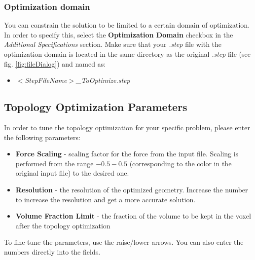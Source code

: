 \documentclass[
12pt, %
a4paper, %
oneside, %
headinclude,footinclude, %
BCOR5mm, %
]{scrartcl}
\begin{document}
\subsubsection{Optimization domain}
You can constrain the solution to be limited to a certain domain of optimization. In order to specify this, select the \textbf{Optimization Domain} checkbox in the \textit{Additional Specifications} section. Make sure that your \textit{.step} file with the optimization domain is located in the same directory as the original \textit{.step} file (see fig. \ref{fig:fileDialog}) and named as:
\begin{itemize}
\item[] \textit{$<$StepFileName$>${\_}ToOptimize.step}
\end{itemize}


\subsection{Topology Optimization Parameters}
In order to tune the topology optimization for your specific problem, please enter the following parameters:
\begin{itemize}
\item \textbf{Force Scaling} - scaling factor for the force from the input file. Scaling is performed from the range $-0.5 - 0.5$ (corresponding to the color in the original input file) to the desired one.
\item \textbf{Resolution} - the resolution of the optimized geometry. Increase the number to increase the resolution and get a more accurate solution.
\item \textbf{Volume Fraction Limit} - the fraction of the volume to be kept in the voxel after the topology optimization
\end{itemize}

To fine-tune the parameters, use the raise/lower arrows. You can also enter the numbers directly into the fields.
\end{document}
